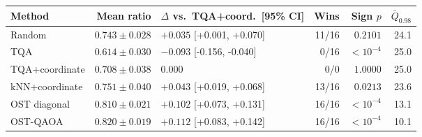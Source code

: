 \begin{tabular}{lrlrrr}
\toprule
Method & Mean ratio & $\Delta$ vs.\ TQA+coord.\ [95\% CI] & Wins & Sign $p$ & $\bar{Q}_{0.98}$ \\
\midrule
Random & $0.743\pm0.028$ & $+0.035$ [+0.001, +0.070] & 11/16 & $0.2101$ & 24.1 \\
TQA & $0.614\pm0.030$ & $-0.093$ [-0.156, -0.040] & 0/16 & $<10^{-4}$ & 25.0 \\
TQA+coordinate & $0.708\pm0.038$ & $0.000$ & 0/0 & $1.0000$ & 25.0 \\
kNN+coordinate & $0.751\pm0.040$ & $+0.043$ [+0.019, +0.068] & 13/16 & $0.0213$ & 23.6 \\
OST diagonal & $0.810\pm0.021$ & $+0.102$ [+0.073, +0.131] & 16/16 & $<10^{-4}$ & 13.1 \\
OST-QAOA & $0.820\pm0.019$ & $+0.112$ [+0.083, +0.142] & 16/16 & $<10^{-4}$ & 10.1 \\
\bottomrule
\end{tabular}
